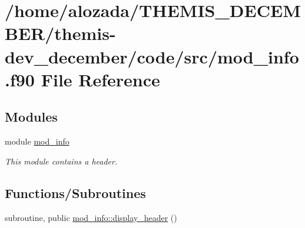 \hypertarget{mod__info_8f90}{}\section{/home/alozada/\+T\+H\+E\+M\+I\+S\+\_\+\+D\+E\+C\+E\+M\+B\+E\+R/themis-\/dev\+\_\+december/code/src/mod\+\_\+info.f90 File Reference}
\label{mod__info_8f90}
\subsection*{Modules}
\begin{DoxyCompactItemize}
\item 
module \hyperlink{namespacemod__info}{mod\+\_\+info}
\begin{DoxyCompactList}\small\item\em This module contains a header. \end{DoxyCompactList}\end{DoxyCompactItemize}
\subsection*{Functions/\+Subroutines}
\begin{DoxyCompactItemize}
\item 
subroutine, public \hyperlink{namespacemod__info_aa386f2ec92c32e2df09330e7f4b23fe3}{mod\+\_\+info\+::display\+\_\+header} ()
\end{DoxyCompactItemize}
